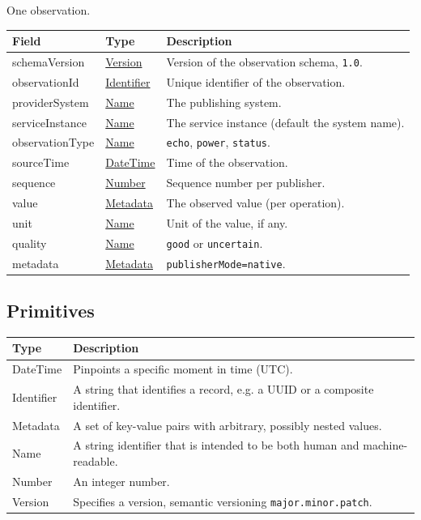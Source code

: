 \documentclass[a4paper]{arrowhead}
\newcommand{\pdef}[1]{{\textcolor{ArrowheadGrey}{#1\label{sec:model:primitives:#1}\label{sec:model:primitives:#1s}\label{sec:model:primitives:#1es}}}}
\newcommand{\pref}[1]{{\textcolor{ArrowheadGrey}{\hyperref[sec:model:primitives:#1]{#1}}}}
\begin{document}
One observation.

\noindent\begin{tabularx}{\textwidth}{| p{4.25cm} | p{3.5cm} | X |} \hline
\rowcolor{gray!33} Field & Type & Description \\ \hline
schemaVersion & \pref{Version} & Version of the observation schema, \texttt{1.0}. \\ \hline
observationId & \pref{Identifier} & Unique identifier of the observation. \\ \hline
providerSystem & \pref{Name} & The publishing system. \\ \hline
serviceInstance & \pref{Name} & The service instance (default the system name). \\ \hline
observationType & \pref{Name} & \texttt{echo}, \texttt{power}, \texttt{status}. \\ \hline
sourceTime & \pref{DateTime} & Time of the observation. \\ \hline
sequence & \pref{Number} & Sequence number per publisher. \\ \hline
value & \pref{Metadata} & The observed value (per operation). \\ \hline
unit & \pref{Name} & Unit of the value, if any. \\ \hline
quality & \pref{Name} & \texttt{good} or \texttt{uncertain}. \\ \hline
metadata & \pref{Metadata} & \texttt{publisherMode=native}. \\ \hline
\end{tabularx}

\subsection{Primitives}
\label{sec:model:primitives}

\noindent\begin{tabularx}{\textwidth}{| p{3cm} | X |} \hline
\rowcolor{gray!33} Type & Description \\ \hline
\pdef{DateTime} & Pinpoints a specific moment in time (UTC). \\ \hline
\pdef{Identifier} & A string that identifies a record, e.g. a UUID or a composite identifier. \\ \hline
\pdef{Metadata} & A set of key-value pairs with arbitrary, possibly nested values. \\ \hline
\pdef{Name} & A string identifier that is intended to be both human and machine-readable. \\ \hline
\pdef{Number} & An integer number. \\ \hline
\pdef{Version} & Specifies a version, semantic versioning \texttt{major.minor.patch}. \\ \hline
\end{tabularx}
\end{document}
